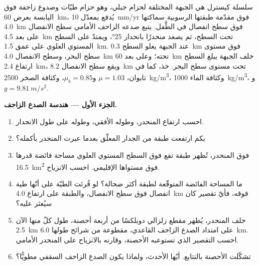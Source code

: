\begin{problem}
\label{pb:b3:orogenic-wedges:1}
سلسلة كيسترل هي الجبهة المختلقة لحزام جبلي، وهو حزام طيّات وصدوع زاحفة
فوق اليابسة بعرض \qty{60}{km}، يُدفع بمعدّل \qty{10}{mm/yr} فوق مقدّمة
طبقتها الرسوبية سماكتها \qty{4.0}{km} فوق سطح انفصال في الطَّفل.
يتبع صدعه الزاحف الأمامي سطح الانفصال على بعد \qty{4.5}{km} تحت السطح، ثم يصعد
منحدرًا بانحدار \ang{25}، ويمتدّ على السطح المستوي العلوي
على عمق \qty{1.5}{km}. عند الجبهة يعلو السطح \qty{0.3}{km} فوق مستوى سطح البحر، وسطح الانفصال
\qty{4.0}{km} تحته؛ وعلى بعد \qty{60}{km} خلف الجبهة يبلغ السطح ارتفاع
\qty{2.4}{km}، ويقع سطح الانفصال
\qty{8.2}{km} تحت مستوى سطح البحر. خذ، كما في تايوان، $\mu = 1.03$ و$\mu_b =
0.85$، وكثافة الصخر \qty{2500}{kg/m^3}، وكثافة الماء \qty{1000}{kg/m^3}،
و$g = \qty{9.81}{m/s^2}$.

\medskip\noindent\textbf{الجزء الأول --- هندسة الصدع الزاحف.}
\begin{enumerate}
  \item احسب ارتفاع المنحدر، وطوله الأفقي، وطوله
        على طول الانحدار.
  \item بكم ارتفعت طبقة من الجدار المعلّق بعدما
        عبرت المنحدر بأكمله؟
  \item فوق المنحدر، تُظهر طبقة تقع فوق السطح المستوي العلوي مساحة فائضة
        قدرها \qty{16.5}{km^2} فوق مستواها الإقليمي. احسب الانزياح.
  \item ما المساحة الفائضة المتوقّعة لطبقة أكثر ضحالة؟ لو قُرئت الطيّة
        على أنّها طية انفصال فوق سطح الانفصال، والطبقة
        على ارتفاع \qty{4.0}{km} فوقه، فأيّ تقصير كان سيُعثر عليه؟
  \item خلف المنحدر، يُظهر مقطع زلزالي دوبلكسًا من أربعة أحصنة، طول كلّ
        منها الآن \qty{2.5}{km} على امتداد الصدع الزاحف القاعدي، مقطوعة من
        شرائح طولها \qty{6.0}{km}. احسب التقصير الذي تستوعبه الأحصنة، وقارنه
        بالانزياح على المنحدر الأمامي.
  \item تشكّلت الأحصنة بالتتابع. أيّها الأحدث، ولماذا
        يكون الصدع الزاحف السقفي مطويًّا؟
\end{enumerate}


\end{problem}

